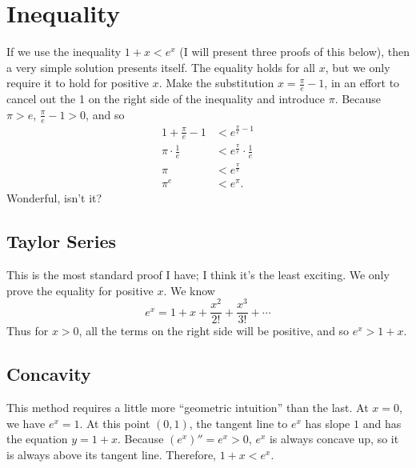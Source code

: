\documentclass[10pt,letterpaper,]{article}
\begin{document}
\hypertarget{inequality}{%
\section{Inequality}\label{inequality}}

If we use the inequality \(1 + x < e^x\) (I will present three proofs of
this below), then a very simple solution presents itself. The equality
holds for all \(x\), but we only require it to hold for positive \(x\).
Make the substitution \(x = \frac{\pi}{e} - 1\), in an effort to cancel
out the 1 on the right side of the inequality and introduce \(\pi\).
Because \(\pi>e\), \(\frac{\pi}{e} - 1 > 0\), and so \begin{equation}
    \begin{split}
        1 + \frac{\pi}{e} - 1 &< e^{\frac{\pi}{e} - 1} \\
        \pi\cdot\frac{1}{e} &< e^{\frac{\pi}{e}} \cdot \frac{1}{e} \\
        \pi &< e^{\frac{\pi}{e}}\\
        \pi^e &< e^\pi.
    \end{split}
\end{equation} Wonderful, isn't it?

\hypertarget{taylor-series}{%
\subsection{Taylor Series}\label{taylor-series}}

This is the most standard proof I have; I think it's the least exciting.
We only prove the equality for positive \(x\). We know \begin{equation}
    e^x = 1 + x + \frac{x^2}{2!} + \frac{x^3}{3!} + \cdots
\end{equation} Thus for \(x > 0\), all the terms on the right side will
be positive, and so \(e^x > 1 + x\).

\hypertarget{concavity}{%
\subsection{Concavity}\label{concavity}}

This method requires a little more ``geometric intuition'' than the
last. At \(x = 0\), we have \(e^x = 1\). At this point \((0,1)\), the
tangent line to \(e^x\) has slope \(1\) and has the equation
\(y = 1 + x\). Because \((e^x)'' = e^x > 0\), \(e^x\) is always concave
up, so it is always above its tangent line. Therefore, \(1 + x < e^x\).
\end{document}

